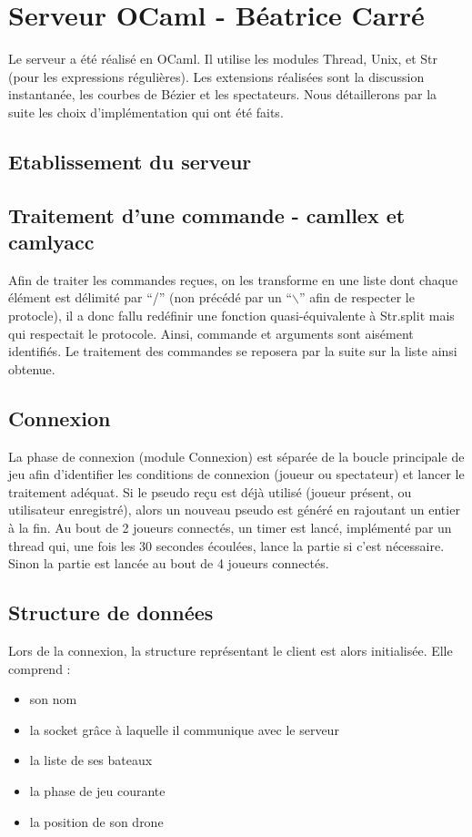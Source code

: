 \documentclass[a4paper, 11pt]{report}
\begin{document}
\chapter{Serveur OCaml - Béatrice Carré}

Le serveur a été réalisé en OCaml. Il utilise les modules Thread, Unix, et Str (pour les expressions régulières).
Les extensions réalisées sont la discussion instantanée, les courbes de Bézier et les spectateurs. Nous détaillerons par la suite les choix d'implémentation qui ont été faits.

\section{Etablissement du serveur}

\section{Traitement d'une commande - camllex et camlyacc}

Afin de traiter les commandes reçues, on les transforme en une liste dont chaque élément est délimité par ``/'' (non précédé par un ``$\backslash$'' afin de respecter le protocle), il a donc fallu redéfinir une fonction quasi-équivalente à Str.split mais qui respectait le protocole. Ainsi, commande et arguments sont aisément identifiés. Le traitement des commandes se reposera par la suite sur la liste ainsi obtenue.

\section{Connexion}

La phase de connexion (module Connexion) est séparée de la boucle principale de jeu afin d'identifier les conditions de connexion (joueur ou spectateur) et lancer le traitement adéquat. Si le pseudo reçu est déjà utilisé (joueur présent, ou utilisateur enregistré), alors un nouveau pseudo est généré en rajoutant un entier à la fin. Au bout de 2 joueurs connectés, un timer est lancé, implémenté par un thread qui, une fois les 30 secondes écoulées, lance la partie si c'est nécessaire. Sinon la partie est lancée au bout de 4 joueurs connectés.

\section{Structure de données}

Lors de la connexion, la structure représentant le client est alors initialisée. Elle comprend :
\begin{itemize}
\item son nom
\item la socket grâce à laquelle il communique avec le serveur
\item la liste de ses bateaux
\item la phase de jeu courante
\item la position de son drone
\end{itemize}
\end{document}
